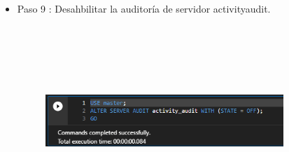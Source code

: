 \begin{itemize}
	\item Paso 9 : Desahbilitar la auditoría de servidor activityaudit. \\\\\\\\\\\\
	\begin{figure}[htb]
	\begin{center}
	\includegraphics[width=9cm]{./Imagenes/audit10}
	\end{center}
	\end{figure}


\end{itemize}